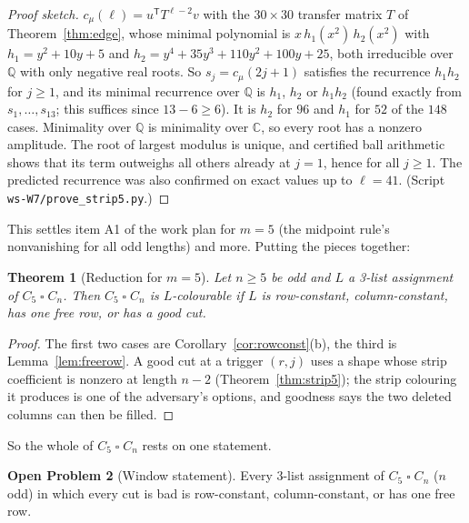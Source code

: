 \documentclass[11pt]{article}
\theoremstyle{plain}
\newtheorem{theorem}{Theorem}[section]
\theoremstyle{definition}
\newtheorem{problem}[theorem]{Open Problem}
\theoremstyle{remark}
\newcommand{\T}{\mathbin{\square}}
\begin{document}
\begin{proof}[Proof sketch]
$c_\mu(\ell) = u^{\mathsf T} T^{\ell - 2} v$ with the $30 \times 30$ transfer matrix $T$ of
Theorem~\ref{thm:edge}, whose minimal polynomial is $x\, h_1(x^2)\, h_2(x^2)$ with $h_1 = y^2 +
10y + 5$ and $h_2 = y^4 + 35y^3 + 110y^2 + 100y + 25$, both irreducible over $\mathbb{Q}$ with
only negative real roots. So $s_j = c_\mu(2j+1)$ satisfies the recurrence $h_1 h_2$ for $j \ge 1$,
and its minimal recurrence over $\mathbb{Q}$ is $h_1$, $h_2$ or $h_1h_2$ (found exactly from
$s_1, \dots, s_{13}$; this suffices since $13 - 6 \ge 6$). It is $h_2$ for $96$ and $h_1$ for $52$
of the $148$ cases. Minimality over $\mathbb{Q}$ is minimality over $\mathbb{C}$, so every root has
a nonzero amplitude. The root of largest modulus is unique, and certified ball arithmetic shows
that its term outweighs all others already at $j = 1$, hence for all $j \ge 1$. The predicted
recurrence was also confirmed on exact values up to $\ell = 41$. (Script
\texttt{ws-W7/prove\_strip5.py}.)
\end{proof}

This settles item A1 of the work plan for $m = 5$ (the midpoint rule's nonvanishing for all odd
lengths) and more. Putting the pieces together:

\begin{theorem}[Reduction for $m = 5$]\label{thm:red5}
Let $n \ge 5$ be odd and $L$ a 3-list assignment of $C_5 \T C_n$. Then $C_5 \T C_n$ is
$L$-colourable if $L$ is row-constant, column-constant, has one free row, or has a good cut.
\end{theorem}

\begin{proof}
The first two cases are Corollary~\ref{cor:rowconst}(b), the third is Lemma~\ref{lem:freerow}.
A good cut at a trigger $(r, j)$ uses a shape whose strip coefficient is nonzero at length
$n - 2$ (Theorem~\ref{thm:strip5}); the strip colouring it produces is one of the adversary's
options, and goodness says the two deleted columns can then be filled.
\end{proof}

So the whole of $C_5 \T C_n$ rests on one statement.

\begin{problem}[Window statement]\label{prob:ext}
Every 3-list assignment of $C_5 \T C_n$ ($n$ odd) in which every cut is bad is row-constant,
column-constant, or has one free row.
\end{problem}
\end{document}
